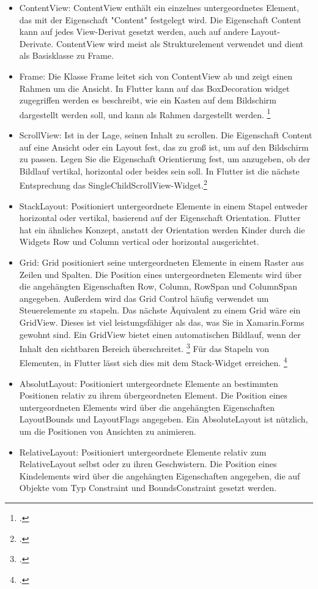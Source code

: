\begin{itemize}
\setlength\itemsep{-0.6em}
 \item ContentView: ContentView enthält ein einzelnes untergeordnetes Element, das mit der Eigenschaft "Content" festgelegt wird. Die Eigenschaft Content kann auf jedes View-Derivat gesetzt werden, auch auf andere Layout-Derivate. ContentView wird meist als Strukturelement verwendet und dient als Basisklasse zu Frame.
 \item Frame: Die Klasse Frame leitet sich von ContentView ab und zeigt einen Rahmen um die Ansicht.  In Flutter kann auf das BoxDecoration widget zugegriffen werden es beschreibt, wie ein Kasten auf dem Bildschirm dargestellt werden soll, und kann als Rahmen dargestellt werden. \footcite[Vgl.][Abgerufen am \today]{GoogleFlutterBoxDecoration2020}
  \item ScrollView: Ist in der Lage, seinen Inhalt zu scrollen.  Die Eigenschaft Content auf eine Ansicht oder ein Layout fest, das zu groß ist, um auf den Bildschirm zu passen.  Legen Sie die Eigenschaft Orientierung fest, um anzugeben, ob der Bildlauf vertikal, horizontal oder beides sein soll. In Flutter ist die nächste Entsprechung das SingleChildScrollView-Widget.\footcite[Vgl.][Abgerufen am \today]{GoogleFlutterSingleChildScrollView2020}
   \item StackLayout: Positioniert untergeordnete Elemente in einem Stapel entweder horizontal oder vertikal,  basierend auf der Eigenschaft Orientation.  Flutter hat ein ähnliches Konzept, anstatt der Orientation werden Kinder durch die Widgets Row und Column vertical oder horizontal ausgerichtet. 
 \item Grid: Grid positioniert seine untergeordneten Elemente in einem Raster aus Zeilen und Spalten. Die Position eines untergeordneten Elements wird über die angehängten Eigenschaften Row, Column, RowSpan und ColumnSpan angegeben.  Außerdem wird das Grid Control häufig verwendet um Steuerelemente zu stapeln.  Das nächste Äquivalent zu einem Grid wäre ein GridView. Dieses ist viel leistungsfähiger als das, was Sie in Xamarin.Forms gewohnt sind. Ein GridView bietet einen automatischen Bildlauf, wenn der Inhalt den sichtbaren Bereich überschreitet. \footcite[Vgl.][Abgerufen am \today]{GoogleFlutterGridView2020}  Für das Stapeln von Elementen,  in Flutter lässt sich dies mit dem Stack-Widget erreichen.  \footcite[Vgl.][Abgerufen am \today]{GoogleFlutterStack2020}
 \item AbsolutLayout: Positioniert untergeordnete Elemente an bestimmten Positionen relativ zu ihrem übergeordneten Element. Die Position eines untergeordneten Elements wird über die angehängten Eigenschaften LayoutBounds und LayoutFlags angegeben. Ein AbsoluteLayout ist nützlich, um die Positionen von Ansichten zu animieren.
 \item RelativeLayout:  Positioniert untergeordnete Elemente relativ zum RelativeLayout selbst oder zu ihren Geschwistern. Die Position eines Kindelements wird über die angehängten Eigenschaften angegeben, die auf Objekte vom Typ Constraint und BoundsConstraint gesetzt werden.
\end{itemize}

